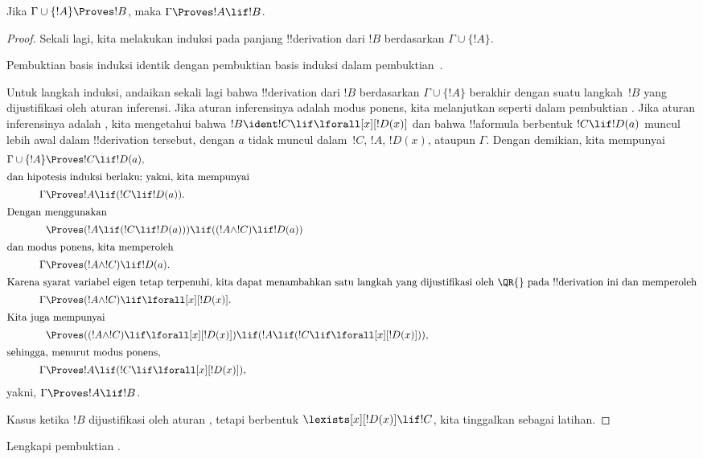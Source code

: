 \documentclass[../../../include/open-logic-section]{subfiles}
\begin{document}


\begin{thm}
 Jika $\Gamma \cup \{!A\} \Proves !B$,
maka $\Gamma \Proves !A \lif !B$.
\end{thm}

\begin{proof}
Sekali lagi, kita melakukan induksi pada panjang !!{derivation} dari
$!B$ berdasarkan $\Gamma \cup \{!A\}$.

Pembuktian basis induksi identik dengan pembuktian basis induksi dalam
pembuktian~.

Untuk langkah induksi, andaikan sekali lagi bahwa !!{derivation} dari
$!B$ berdasarkan $\Gamma \cup \{!A\}$ berakhir dengan suatu langkah~$!B$
yang dijustifikasi oleh aturan inferensi. Jika aturan inferensinya adalah
modus ponens, kita melanjutkan seperti dalam pembuktian
. Jika aturan inferensinya adalah \QR, kita
mengetahui bahwa $!B \ident !C \lif \lforall[x][!D(x)]$ dan bahwa
!!a{formula} berbentuk $!C \lif !D(a)$ muncul lebih awal dalam
!!{derivation} tersebut, dengan $a$ tidak muncul dalam~$!C$, $!A$,
$!D(x)$, ataupun $\Gamma$. Dengan demikian, kita mempunyai
\begin{align*}
  \Gamma \cup \{!A\} & \Proves !C \lif !D(a),\\
  \intertext{dan hipotesis induksi berlaku; yakni, kita mempunyai}
    \Gamma & \Proves !A \lif (!C \lif !D(a)).\\
  \intertext{Dengan menggunakan}
  & \Proves (!A \lif (!C \lif !D(a))) \lif ((!A \land !C) \lif !D(a))\\
  \intertext{dan modus ponens, kita memperoleh}
  \Gamma & \Proves (!A \land !C) \lif !D(a).\\
  \intertext{Karena syarat variabel eigen tetap terpenuhi, kita dapat
    menambahkan satu langkah yang dijustifikasi oleh \QR{} pada
    !!{derivation} ini dan memperoleh}
    \Gamma & \Proves (!A \land !C) \lif \lforall[x][!D(x)].\\
    \intertext{Kita juga mempunyai}
    & \Proves ((!A \land !C) \lif \lforall[x][!D(x)]) \lif
      (!A \lif (!C \lif \lforall[x][!D(x)])),\\
    \intertext{sehingga, menurut modus ponens,}
    \Gamma & \Proves !A \lif (!C \lif \lforall[x][!D(x)]),
\end{align*}
yakni, $\Gamma \Proves !A \lif !B$.

Kasus ketika $!B$ dijustifikasi oleh aturan \QR, tetapi berbentuk
$\lexists[x][!D(x)] \lif !C$, kita tinggalkan sebagai latihan.
\end{proof}

\begin{prob}
  Lengkapi pembuktian .
\end{prob}
\end{document}

